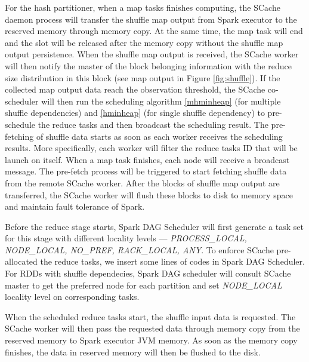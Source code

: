 For the hash partitioner, when a map tasks finishes computing, the SCache daemon process will transfer the shuffle map output from Spark executor to the reserved memory through memory copy. 
At the same time, the map task will end and the slot will be released after the memory copy without the shuffle map output persistence. 
When the shuffle map output is received, the SCache worker will then notify the master of the block belonging information with the reduce size distribution in this block (see map output in Figure \ref{fig:shuffle}). 
If the collected map output data reach the observation threshold, the SCache co-scheduler will then run the scheduling algorithm \ref{mhminheap} (for multiple shuffle dependencies) and \ref{hminheap} (for single shuffle dependency) to pre-schedule the reduce tasks and then broadcast the scheduling result.
The pre-fetching of shuffle data starts as soon as each worker receives the scheduling results. 
More specifically, each worker will filter the reduce tasks ID that will be launch on itself. 
When a map task finishes, each node will receive a broadcast message. The pre-fetch process will be triggered to start fetching shuffle data from the remote SCache worker. After the blocks of shuffle map output are transferred, the SCache worker will flush these blocks to disk to memory space and maintain fault tolerance of Spark. 

Before the reduce stage starts, Spark DAG Scheduler will first generate a task set for this stage with different locality levels --- \textit{PROCESS\_LOCAL, NODE\_LOCAL, NO\_PREF, RACK\_LOCAL, ANY}.
To enforce SCache pre-allocated the reduce tasks, we insert some lines of codes in Spark DAG Scheduler.
For RDDs with shuffle dependecies, Spark DAG scheduler will consult SCache master to get the preferred node for each partition and set \textit{NODE\_LOCAL} locality level on corresponding tasks. 

When the scheduled reduce tasks start, the shuffle input data is requested. The SCache worker will then pass the requested data through memory copy from the reserved memory to Spark executor JVM memory. As soon as the memory copy finishes, the data in reserved memory will then be flushed to the disk.

